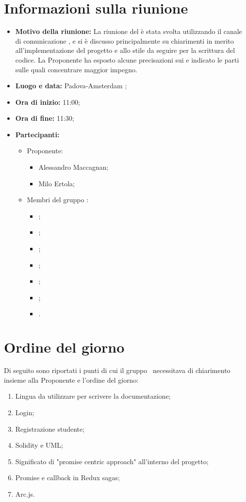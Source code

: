 \documentclass[VER-2017-11-22.tex]{subfiles}
\begin{document}
\chapter{Informazioni sulla riunione} 
\begin{itemize}
	\item \textbf{Motivo della riunione:} La riunione del  è stata svolta utilizzando il canale di comunicazione , e si è discusso principalmente su chiarimenti in merito all'implementazione del progetto e allo stile da seguire per la scrittura del codice. La Proponente ha esposto alcune precisazioni sui  e indicato le parti sulle quali concentrare maggior impegno.
	\item \textbf{Luogo e data:} Padova-Amsterdam ;
	\item \textbf{Ora di inizio:} 11:00;
	\item \textbf{Ora di fine:} 11:30;
	\item \textbf{Partecipanti:}
	\begin{itemize}
	\item Proponente:
	\begin{itemize}
		\item Alessandro Maccagnan;
		\item Milo Ertola;
	\end{itemize}
	\item Membri del gruppo \gruppo:
	\begin{itemize}
		\item \Davide;
		\item \Elena;
		\item \Gianluca;
		\item \Mirco;
		\item \Parwinder;
		\item \Riccardo;
		\item \Valentina.
	\end{itemize}
	\end{itemize}
\end{itemize}

\chapter{Ordine del giorno}
Di seguito sono riportati i punti di cui il gruppo \gruppo\ necessitava di chiarimento insieme alla Proponente e l'ordine del giorno:
\begin{enumerate}
	\item Lingua da utilizzare per scrivere la documentazione;
	\item Login;
	\item Registrazione studente;
	\item Solidity e UML;
	\item Significato di "promise centric approach" all'interno del progetto;
	\item Promise e callback in Redux sagas;
	\item Arc.js.
\end{enumerate}
\end{document}
